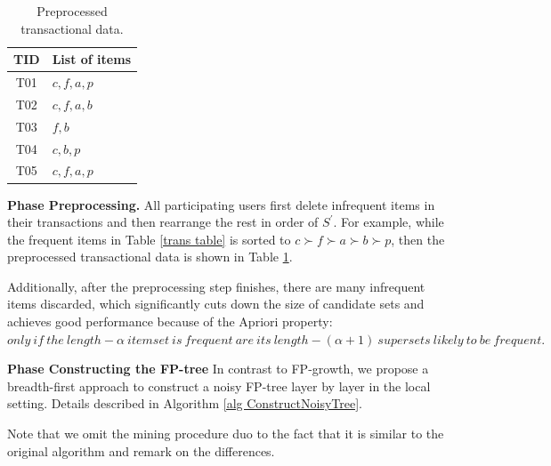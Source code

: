 \documentclass[conference]{IEEEtran}
\begin{document}
\begin{table}[tb]
\caption{{\color{red}Preprocessed transactional data.}}
\label{preprocessed trans}
\centering
\begin{tabular}{|c|l|}\hline
  TID&List of items \\\hline
  T01&$c,f,a,p$ \\\hline
  T02&$c,f,a,b$ \\\hline
  T03&$f,b$ \\\hline
  T04&$c,b,p$ \\\hline
  T05&$c,f,a,p$ \\\hline
\end{tabular}
\end{table}

\textbf{Phase \uppercase\expandafter{} Preprocessing.} All participating users first delete infrequent items in their transactions and then rearrange the rest in order of $S^{\prime}$. For example, while the frequent items in Table \ref{trans table} is sorted to $c\succ f\succ a\succ b\succ p$, then the preprocessed transactional data is shown in Table \ref{preprocessed trans}.

Additionally, after the preprocessing step finishes, there are many infrequent items discarded, which significantly cuts down the size of candidate sets and achieves good performance because of the Apriori property\cite{apr}: {\color{red} $only\ if\ the\ length-\alpha\ itemset\ is\ frequent\ are\ its\ length-(\alpha +1)\ supersets\ likely\ to\ be\ frequent.$}

\textbf{Phase \uppercase\expandafter{} Constructing the FP-tree} In contrast to FP-growth, we propose a breadth-first approach to construct a noisy FP-tree layer by layer in the local setting. Details described in Algorithm \ref{alg ConstructNoisyTree}. 

Note that we omit the mining procedure duo to the fact that it is similar to the original algorithm and remark on the differences.
\end{document}
